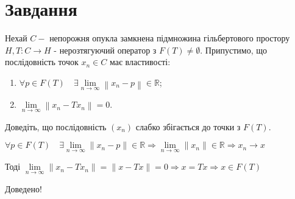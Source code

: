 
\chapter{Завдання \theHchapter}

\begin{tcolorbox}[title=Завдання]
    Нехай $C-$ непорожня опукла замкнена підмножина гільбертового простору 
    $H, T: C \rightarrow H$ - нерозтягуючий оператор з $F(T) \neq \emptyset$.
    Припустимо, що послідовність точок $x_{n} \in C$ має властивості:
    \begin{enumerate}
        \item $\forall p \in F(T) \quad \exists \lim\limits_{n \rightarrow \infty}
        \left\|x_{n}-p\right\| \in \mathbb{R}$;
        \item $\lim\limits_{n \rightarrow \infty}\left\|x_{n}-T x_{n}\right\|=0$.
    \end{enumerate}

    Доведіть, що послідовність $\left(x_{n}\right)$ слабко 
    збігається до точки з $ F(T)$.
\end{tcolorbox}



$\forall p \in F(T) \quad \exists \lim\limits_{n\rightarrow\infty}\|x_n - p\| 
\in \mathbb{R} \Rightarrow \lim\limits_{n\rightarrow\infty}\|x_n\| \in 
\mathbb{R} \Rightarrow x_n \rightarrow x$


Тоді $\lim\limits_{n\rightarrow \infty}\|x_n - Tx_n\| = \|x - Tx\| = 0 
\Rightarrow x = Tx \Rightarrow x \in F(T)$ 


Доведено!